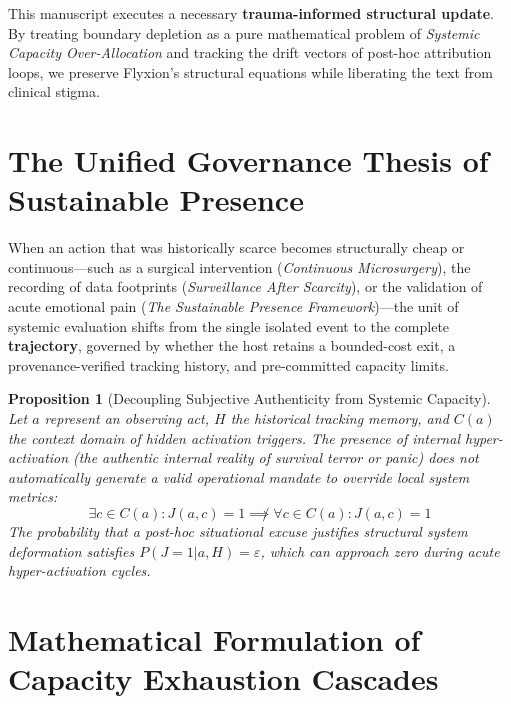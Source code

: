 \documentclass[11pt,oneside,letterpaper]{article}
\newtheorem{proposition}[theorem]{Proposition}
\begin{document}
This manuscript executes a necessary \textbf{trauma-informed structural update}. By treating boundary depletion as a pure mathematical problem of \textit{Systemic Capacity Over-Allocation} and tracking the drift vectors of post-hoc attribution loops, we preserve Flyxion's structural equations while liberating the text from clinical stigma.

\section{The Unified Governance Thesis of Sustainable Presence}

When an action that was historically scarce becomes structurally cheap or continuous—such as a surgical intervention (\textit{Continuous Microsurgery}), the recording of data footprints (\textit{Surveillance After Scarcity}), or the validation of acute emotional pain (\textit{The Sustainable Presence Framework})—the unit of systemic evaluation shifts from the single isolated event to the complete \textbf{trajectory}, governed by whether the host retains a bounded-cost exit, a provenance-verified tracking history, and pre-committed capacity limits.

\begin{proposition}[Decoupling Subjective Authenticity from Systemic Capacity]
Let $a$ represent an observing act, $H$ the historical tracking memory, and $C(a)$ the context domain of hidden activation triggers. The presence of internal hyper-activation (the authentic internal reality of survival terror or panic) does not automatically generate a valid operational mandate to override local system metrics:
\begin{equation}
\exists c \in C(a): J(a,c)=1 \not\implies \forall c \in C(a): J(a,c)=1
\end{equation}
The probability that a post-hoc situational excuse justifies structural system deformation satisfies $P(J=1|a,H) = \varepsilon$, which can approach zero during acute hyper-activation cycles.
\end{proposition}

\section{Mathematical Formulation of Capacity Exhaustion Cascades}
\end{document}
